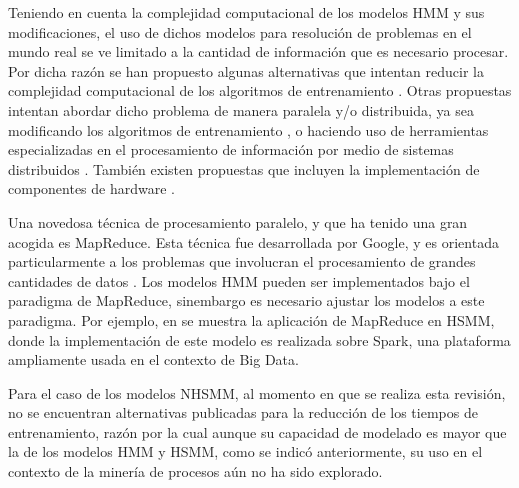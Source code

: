 Teniendo en cuenta la complejidad computacional de los modelos HMM y sus modificaciones, el uso de dichos modelos para resolución de problemas en el mundo real se ve limitado a la cantidad de información que es necesario procesar. Por dicha razón se han propuesto algunas alternativas que intentan reducir la complejidad computacional de los algoritmos de entrenamiento \cite{Yu2003,Shun-ZhengYu2003}. Otras propuestas intentan abordar dicho problema de manera paralela y/o distribuida, ya sea modificando los algoritmos de entrenamiento \cite{Turin1998,Li2008}, o haciendo uso de herramientas especializadas en el procesamiento de información por medio de sistemas distribuidos \cite{Shun-ZhengYuZhenLiuMarkSSquillanteCathyXia}. También existen propuestas que incluyen la implementación de componentes de hardware \cite{Maurer2014,Yoshizawa2006}.

Una novedosa técnica de procesamiento paralelo, y que ha tenido una gran acogida es MapReduce. Esta técnica fue desarrollada por Google, y es orientada particularmente a los problemas que involucran el procesamiento de grandes cantidades de datos \cite{Li1999}. Los modelos HMM pueden ser implementados bajo el paradigma de MapReduce, sinembargo es necesario ajustar los modelos a este paradigma. Por ejemplo, en \cite{Hongeng2003} se muestra la aplicación de MapReduce en HSMM, donde la implementación de este modelo es realizada sobre Spark, una plataforma ampliamente usada en el contexto de Big Data.

Para el caso de los modelos NHSMM, al momento en que se realiza esta revisión, no se encuentran alternativas publicadas para la reducción de los tiempos de entrenamiento, razón por la cual aunque su capacidad de modelado es mayor que la de los modelos HMM y HSMM, como se indicó anteriormente, su uso en el contexto de la minería de procesos aún no ha sido explorado.
